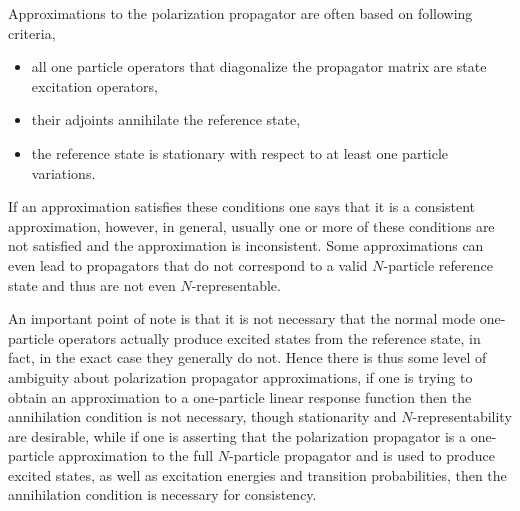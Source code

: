\documentclass[aps,preprint]{revtex4}%
\begin{document}
Approximations to the polarization propagator are often based on following criteria,

\begin{itemize}
\item all one particle operators that diagonalize the propagator matrix are
state excitation operators,

\item their adjoints annihilate the reference state,

\item the reference state is stationary with respect to at least one particle variations.
\end{itemize}

If an approximation satisfies these conditions one says that it is a
consistent approximation, however, in general, usually one or more of these
conditions are not satisfied and the approximation is inconsistent. Some
approximations can even lead to propagators that do not correspond to a valid
$N$-particle reference state and thus are not even $N$-representable.

An important point of note is that it is not necessary that the normal mode
one-particle operators actually produce excited states from the reference
state, in fact, in the exact case they generally do not. Hence there is thus
some level of ambiguity about polarization propagator approximations, if one
is trying to obtain an approximation to a one-particle linear response
function then the annihilation condition is not necessary, though stationarity
and $N$-representability are desirable, while if one is asserting that the
polarization propagator is a one-particle approximation to the full
$N$-particle propagator and is used to produce excited states, as well as
excitation energies and transition probabilities, then the annihilation
condition is necessary for consistency.
\end{document}
